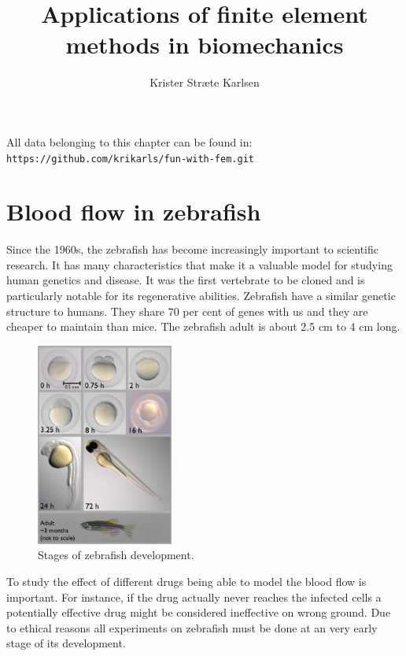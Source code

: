 \documentclass[epsfig,11pt]{article}
\title{Applications of finite element methods in biomechanics}
\author{Krister Stræte Karlsen}
\begin{document}
\maketitle

All data belonging to this chapter can be found in: \\
{\color{Strings} \texttt{https://github.com/krikarls/fun-with-fem.git} }

\section{Blood flow in zebrafish}

Since the 1960s, the zebrafish has become increasingly important to scientific research. It has many characteristics that make it a valuable model for studying human genetics and disease. It was the first vertebrate to be cloned and is particularly notable for its regenerative abilities. Zebrafish have a similar genetic structure to humans. They share 70 per cent of genes with us and they are cheaper to maintain than mice. The zebrafish adult is about 2.5 cm to 4 cm long. 

\begin{figure}
  \begin{center}
    \includegraphics[width=0.4\textwidth]{zebrafish.png}
  \end{center}
  \caption{Stages of zebrafish development.}
\end{figure}

To study the effect of different drugs being able to model the blood flow is important. For instance, if the drug actually never reaches the infected cells a potentially effective drug might be considered ineffective on wrong ground. Due to ethical reasons all experiments on zebrafish must be done at an very early stage of its development.
\end{document}
